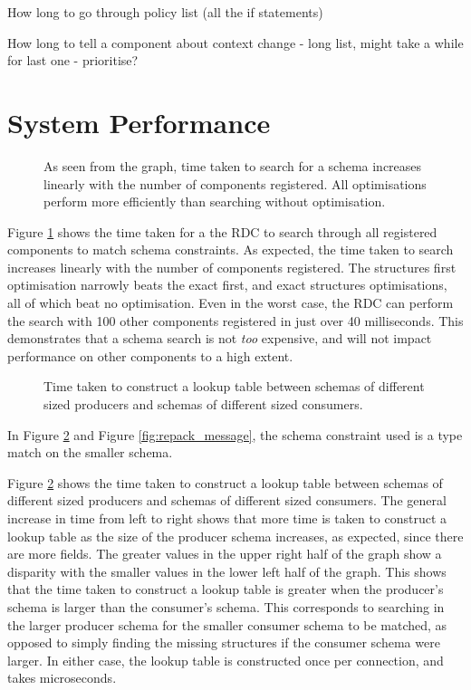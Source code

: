 \documentclass[12pt,twoside,notitlepage]{report}
\begin{document}
How long to go through policy list (all the if statements)

How long to tell a component about context change - long list, might take a while for last one - prioritise?

\section{System Performance}

\begin{figure}[tbh]
\centerline{}
\caption[RDC Search Optimisations]{As seen from the graph, time taken to search for a schema increases linearly with the number of components registered. All optimisations perform more efficiently than searching without optimisation.}
\label{fig:rdc_search_optimisations}
\end{figure}

Figure \ref{fig:rdc_search_optimisations} shows the time taken for a the RDC to search through all registered components to match schema constraints. 
As expected, the time taken to search increases linearly with the number of components registered. 
The structures first optimisation narrowly beats the exact first, and exact structures optimisations, all of which beat no optimisation. 
Even in the worst case, the RDC can perform the search with 100 other components registered in just over 40 milliseconds. 
This demonstrates that a schema search is not {\sl too} expensive, and will not impact performance on other components to a high extent. 

\begin{figure}[tbh]
\centerline{}
\caption[Construct Lookup Times]{Time taken to construct a lookup table between schemas of different sized producers and schemas of different sized consumers.}
\label{fig:construct_lookup}
\end{figure}

In Figure \ref{fig:construct_lookup} and Figure \ref{fig:repack_message}, the schema constraint used is a type match on the smaller schema. 

Figure \ref{fig:construct_lookup} shows the time taken to construct a lookup table between schemas of different sized producers and schemas of different sized consumers. 
The general increase in time from left to right shows that more time is taken to construct a lookup table as the size of the producer schema increases, as expected, since there are more fields. 
The greater values in the upper right half of the graph show a disparity with the smaller values in the lower left half of the graph. 
This shows that the time taken to construct a lookup table is greater when the producer's schema is larger than the consumer's schema. 
This corresponds to searching in the larger producer schema for the smaller consumer schema to be matched, as opposed to simply finding the missing structures if the consumer schema were larger.
In either case, the lookup table is constructed once per connection, and takes microseconds.
\end{document}
